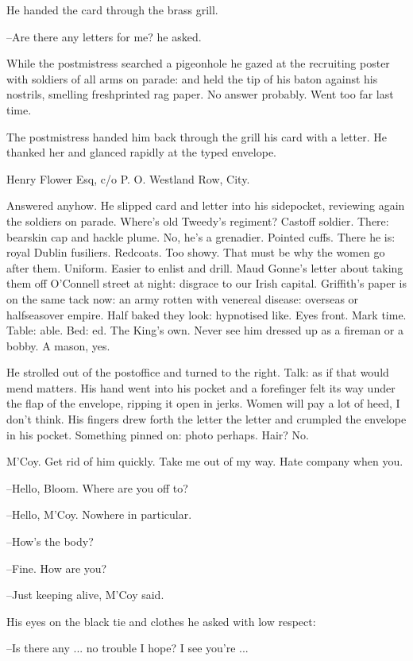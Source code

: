 He handed the card through the brass grill.

--Are there any letters for me? he asked.

While the postmistress searched a pigeonhole he gazed at the recruiting
poster with soldiers of all arms on parade: and held the tip of his baton
against his nostrils, smelling freshprinted rag paper. No answer
probably. Went too far last time.

The postmistress handed him back through the grill his card with a
letter. He thanked her and glanced rapidly at the typed envelope.


Henry Flower Esq,
c/o P. O. Westland Row,
City.


Answered anyhow. He slipped card and letter into his sidepocket,
reviewing again the soldiers on parade. Where's old Tweedy's regiment?
Castoff soldier. There: bearskin cap and hackle plume. No, he's a
grenadier. Pointed cuffs. There he is: royal Dublin fusiliers. Redcoats.
Too showy. That must be why the women go after them. Uniform. Easier to
enlist and drill. Maud Gonne's letter about taking them off O'Connell
street at night: disgrace to our Irish capital. Griffith's paper is on
the same tack now: an army rotten with venereal disease: overseas or
halfseasover empire. Half baked they look: hypnotised like. Eyes front.
Mark time. Table: able. Bed: ed. The King's own. Never see him dressed up
as a fireman or a bobby. A mason, yes.

He strolled out of the postoffice and turned to the right. Talk: as if
that would mend matters. His hand went into his pocket and a forefinger
felt its way under the flap of the envelope, ripping it open in jerks.
Women will pay a lot of heed, I don't think. His fingers drew forth the
letter the letter and crumpled the envelope in his pocket. Something
pinned on: photo perhaps. Hair? No.

M'Coy. Get rid of him quickly. Take me out of my way. Hate company when
you.

--Hello, Bloom. Where are you off to?

--Hello, M'Coy. Nowhere in particular.

--How's the body?

--Fine. How are you?

--Just keeping alive, M'Coy said.

His eyes on the black tie and clothes he asked with low respect:

--Is there any ... no trouble I hope? I see you're ...

